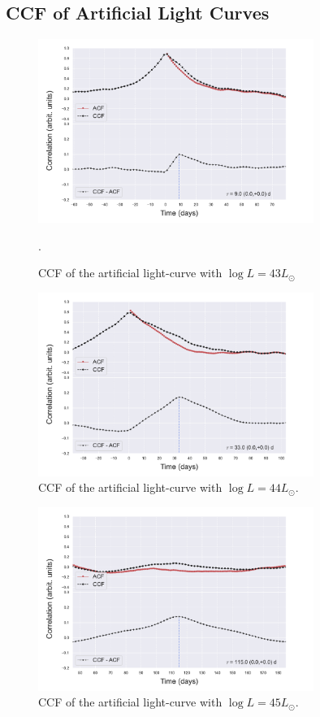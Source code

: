 \documentclass[letterpaper, oneside]{article}
\begin{document}
\subsection{CCF of Artificial Light Curves}

\begin{figure}[h]
	\centering
	\includegraphics[width=0.8\textwidth]{../CCF_plots/x_y_bands_43_final.pdf}
	\caption{CCF of the artificial light-curve with $\log L = 43 L_{\odot}$}.
	\label{fig:ccf_art_lcs_L43}
\end{figure}

\begin{figure}[h]
	\centering
	\includegraphics[width=0.8\textwidth]{../CCF_plots/x_y_bands_44_final.pdf}
	\caption{CCF of the artificial light-curve with $\log L = 44 L_{\odot}$.}
	\label{fig:ccf_art_lcs_L44}
\end{figure}

\begin{figure}[h]
	\centering
	\includegraphics[width=0.8\textwidth]{../CCF_plots/x_y_bands_45_final.pdf}
	\caption{CCF of the artificial light-curve with $\log L = 45 L_{\odot}$.}
	\label{fig:ccf_art_lcs_L45}
\end{figure}
\end{document}
